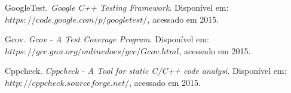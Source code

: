 \documentclass[conference]{Trabalho_1}
\begin{document}


%
%
%
\begin{thebibliography}{1}
GoogleTest. \emph{Google C++ Testing Framework}. Dispon\'ivel em: $https://code.google.com/p/googletest/$, acessado em 2015.

Gcov. \emph{Gcov - A Test Coverage Program}. Dispon\'ivel em: $https://gcc.gnu.org/onlinedocs/gcc/Gcov.html$, acessado em 2015.

Cppcheck. \emph{Cppcheck - A Tool for static C/C++ code analysi}. Dispon\'ivel em: $http://cppcheck.sourceforge.net/$, acessado em 2015.
\end{thebibliography}




\end{document}
